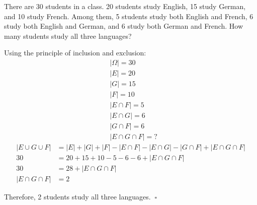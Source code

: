 \documentclass[a4paper,10pt]{article}
\begin{document}
\begin{problem}
	There are 30 students in a class. 20 students study English, 15 study German, and 10 study French. Among them, 5 students study both English and French, 6 study both English and German, and 6 study both German and French. How many students study all three languages?

	Using the principle of inclusion and exclusion:
	\[
		\begin{aligned}
		& |\Omega| = 30 \\
		& |E| = 20 \\
		& |G| = 15 \\
		& |F| = 10 \\
		& |E \cap F| = 5 \\
		& |E \cap G| = 6 \\
		& |G \cap F| = 6 \\
		& |E \cap G \cap F| = ?
		\end{aligned}
	\]
	\[
		\begin{aligned}
			|E \cup G \cup F| &= |E| + |G| + |F| - |E \cap F| - |E \cap G| - |G \cap F| + |E \cap G \cap F| \\
			30 &= 20 + 15 + 10 - 5 - 6 - 6 + |E \cap G \cap F| \\
			30 &= 28 + |E \cap G \cap F| \\
			|E \cap G \cap F| &= 2
		\end{aligned}
	\]

	Therefore, 2 students study all three languages. \(\ \square \)
\end{problem}

\newpage
\end{document}
